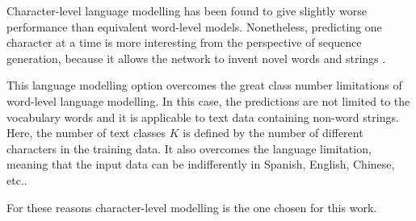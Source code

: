 Character-level language modelling has been found to give slightly worse performance than equivalent word-level models. Nonetheless, predicting one character at a time is more interesting from the perspective of sequence generation, because it allows the network to invent novel words and strings \cite{graves2013generating}. 

This language modelling option overcomes the great class number limitations of word-level language modelling. In this case, the predictions are not limited to the vocabulary words and it is applicable to text data containing non-word strings. Here, the number of text classes $K$ is defined by the number of different characters in the training data. It also overcomes the language limitation, meaning that the input data can be indifferently in Spanish, English, Chinese, etc.. 

For these reasons character-level modelling is the one chosen for this work.

 


